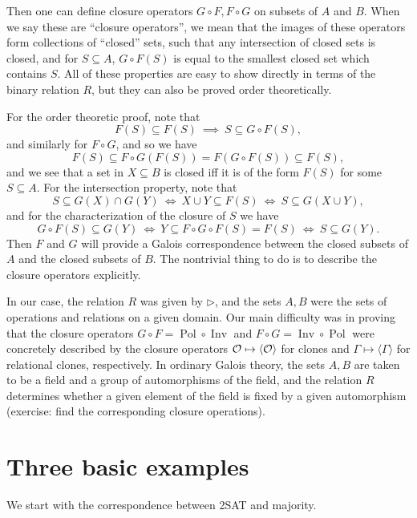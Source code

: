 \documentclass[letterpaper,11pt]{article}
\DeclareMathOperator{\Pol}{Pol}
\DeclareMathOperator{\Inv}{Inv}
\begin{document}
\begin{rem}
Then one can define closure operators $G\circ F, F\circ G$ on subsets of $A$ and $B$. When we say these are ``closure operators'', we mean that the images of these operators form collections of ``closed'' sets, such that any intersection of closed sets is closed, and for $S \subseteq A$, $G\circ F(S)$ is equal to the smallest closed set which contains $S$. All of these properties are easy to show directly in terms of the binary relation $R$, but they can also be proved order theoretically.

For the order theoretic proof, note that
\[
F(S) \subseteq F(S)\ \implies\ S \subseteq G\circ F(S),
\]
and similarly for $F\circ G$, and so we have
\[
F(S) \subseteq F\circ G(F(S)) = F(G\circ F(S)) \subseteq F(S),
\]
and we see that a set in $X \subseteq B$ is closed iff it is of the form $F(S)$ for some $S \subseteq A$. For the intersection property, note that
\[
S \subseteq G(X) \cap G(Y)\ \iff\ X \cup Y \subseteq F(S)\ \iff\ S \subseteq G(X\cup Y),
\]
and for the characterization of the closure of $S$ we have
\[
G\circ F(S) \subseteq G(Y)\ \iff\ Y \subseteq F\circ G\circ F(S) = F(S)\ \iff\ S \subseteq G(Y).
\]
Then $F$ and $G$ will provide a Galois correspondence between the closed subsets of $A$ and the closed subsets of $B$. The nontrivial thing to do is to describe the closure operators explicitly.

In our case, the relation $R$ was given by $\rhd$, and the sets $A,B$ were the sets of operations and relations on a given domain. Our main difficulty was in proving that the closure operators $G\circ F = \Pol \circ \Inv$ and $F \circ G = \Inv \circ \Pol$ were concretely described by the closure operators $\mathcal{O} \mapsto \langle \mathcal{O} \rangle$ for clones and $\Gamma \mapsto \langle \Gamma \rangle$ for relational clones, respectively. In ordinary Galois theory, the sets $A,B$ are taken to be a field and a group of automorphisms of the field, and the relation $R$ determines whether a given element of the field is fixed by a given automorphism (exercise: find the corresponding closure operations).
\end{rem}


\section{Three basic examples}

We start with the correspondence between 2SAT and majority.
\end{document}
